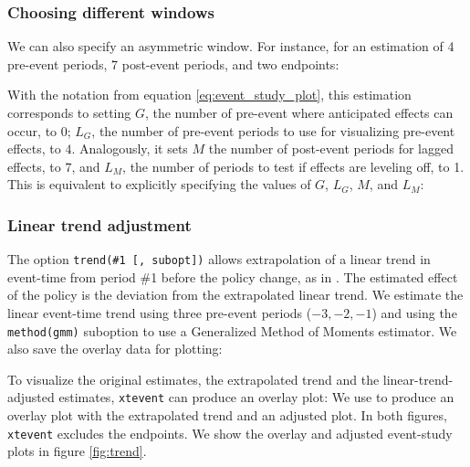 \documentclass[12pt]{article}
\begin{document}
\begin{stlog}
	\nullskip
\end{stlog}

\subsubsection*{Choosing different windows}

We can also specify an asymmetric window.
For instance, for an estimation of 4 pre-event periods, 7 post-event periods, and two endpoints:

\begin{stlog}
	\nullskip
\end{stlog}

With the notation from equation \eqref{eq:event_study_plot}, this estimation corresponds to setting $G$, the number of pre-event where anticipated effects can occur, to 0; $L_G$, the number of pre-event periods to use for visualizing pre-event effects, to $4$.
Analogously, it sets $M$ the number of post-event periods for lagged effects, to $7$, and $L_M$, the number of periods to test if effects are leveling off, to 1.
This is equivalent to explicitly specifying the values of $G$, $L_G$, $M$, and $L_M$:

\begin{stlog}
	\nullskip
\end{stlog}

\subsubsection*{Linear trend adjustment}

The option \texttt{trend(\#1 [, subopt])} allows extrapolation of a linear trend in event-time from period \#1 before the policy change, as in \citet{dobkin2018economic}.
The estimated effect of the policy is the deviation from the extrapolated linear trend.
We estimate the linear event-time trend using three pre-event periods ($-3, -2,-1$) and using the \texttt{method(gmm)} suboption to use a Generalized Method of Moments estimator.
We also save the overlay data for plotting:

\begin{stlog}
	\nullskip
\end{stlog}

To visualize the original estimates, the extrapolated trend and the linear-trend-adjusted estimates, \texttt{xtevent} can produce an overlay plot:
We use \xteventplot to produce an overlay plot with the extrapolated trend and an adjusted plot. In both figures, \texttt{xtevent} excludes the endpoints.
We show the overlay and adjusted event-study plots in figure \ref{fig:trend}.
\end{document}
